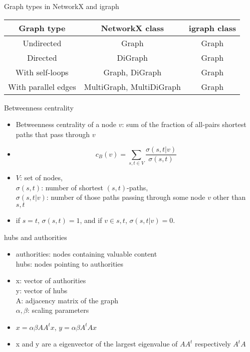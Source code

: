 \documentclass[12pt]{beamer}
\begin{document}
	\begin{frame}{Graph types in NetworkX and igraph}
		\centering
		\begin{tabular}[]{c|c|c}
			Graph type & NetworkX class & igraph class \\
			\hline
			Undirected & Graph & Graph \\
			Directed & DiGraph & Graph \\
			With self-loops & Graph, DiGraph & Graph \\
			With parallel edges & MultiGraph, MultiDiGraph & Graph
		\end{tabular}
	\end{frame}
	\begin{frame}{Betweenness centrality}
		\begin{itemize}
			\item Betweenness centrality of a node $v$: sum of the
			fraction of all-pairs shortest paths that pass through $v$
			\item 		
			\begin{equation*}
			c_B(v) =\sum_{s,t \in V} \frac{\sigma(s, t|v)}{\sigma(s, t)}
			\end{equation*}	
			\item  $V$: set of nodes,\\
			$\sigma(s, t)$: number of
			shortest $(s, t)$-paths, \\
			$\sigma(s, t|v)$: number of those
			paths  passing through some  node $v$ other than $s, t$
			\item if $s = t$, $\sigma(s, t) = 1$, and if $v \in {s, t}$,
			$\sigma(s, t|v) = 0$.
		\end{itemize}
	\end{frame}
	\begin{frame}{hubs and authorities}
		\begin{itemize}
			\item authorities: nodes containing valuable content\\
			hubs: nodes pointing to authorities
			\item x: vector of authorities \\
			y: vector of hubs \\
			A: adjacency matrix of the graph \\
			$\alpha,\beta$: scaling parameters
			\item $x = \alpha \beta A A^t x$, $y = \alpha \beta A^t A x$
			\item x and y are a eigenvector of the largest eigenvalue of $A A^t$ respectively $A^t A$
		\end{itemize}
	\end{frame}
\end{document}
